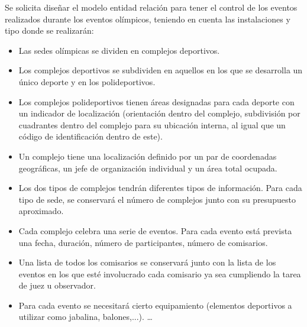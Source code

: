 Se solicita diseñar el modelo entidad relación para tener el control de los eventos realizados durante los eventos olímpicos, teniendo en cuenta las instalaciones y tipo donde se realizarán:
\begin{itemize}  
\item Las sedes olímpicas se dividen en complejos deportivos.
\item Los complejos deportivos se subdividen en aquellos en los que se desarrolla un único deporte y en los polideportivos.
\item Los complejos polideportivos tienen áreas designadas para cada deporte con un indicador de localización (orientación dentro del complejo, subdivisión por cuadrantes dentro del complejo para su ubicación interna, al igual que un código de identificación dentro de este).
\item Un complejo tiene una localización definido por un par de coordenadas geográficas, un jefe de organización individual y un área total ocupada.
\item Los dos tipos de complejos tendrán diferentes tipos de información. Para cada tipo de sede, se conservará el número de complejos junto con su presupuesto aproximado.
\item Cada complejo celebra una serie de eventos. Para cada evento está prevista una fecha, duración, número de participantes, número de comisarios.
\item Una lista de todos los comisarios se conservará junto con la lista de los eventos en los que esté involucrado cada comisario ya sea cumpliendo la tarea de juez u observador.
\item Para cada evento se necesitará cierto equipamiento (elementos deportivos a utilizar como jabalina, balones,...). \ldots 
\end{itemize}